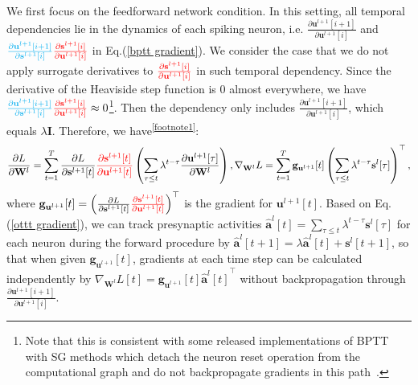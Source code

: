 \documentclass{article}
\begin{document}
We first focus on the feedforward network condition. In this setting, all temporal dependencies lie in the dynamics of each spiking neuron, i.e. {\color[rgb]{0,0.69,0.31}$\frac{\partial \mathbf{u}^{l+1}[i+1]}{\partial \mathbf{u}^{l+1}[i]}$} and ${\color{cyan}\frac{\partial \mathbf{u}^{l+1}[i+1]}{\partial \mathbf{s}^{l+1}[i]}}{\color{red}\frac{\partial \mathbf{s}^{l+1}[i]}{\partial \mathbf{u}^{l+1}[i]}}$ in Eq.(\ref{bptt gradient}). We consider the case that we do not apply surrogate derivatives to ${\color{red}\frac{\partial \mathbf{s}^{l+1}[i]}{\partial \mathbf{u}^{l+1}[i]}}$ in such temporal dependency. Since the derivative of the Heaviside step function is 0 almost everywhere, we have ${\color{cyan}\frac{\partial \mathbf{u}^{l+1}[i+1]}{\partial \mathbf{s}^{l+1}[i]}}{\color{red}\frac{\partial \mathbf{s}^{l+1}[i]}{\partial \mathbf{u}^{l+1}[i]}} \approx 0$\footnote{Note that this is consistent with some released implementations of BPTT with SG methods which detach the neuron reset operation from the computational graph and do not backpropagate gradients in this path~\cite{Fang_2021_ICCV,fang2021deep}.}. Then the dependency only includes {\color[rgb]{0,0.69,0.31}$\frac{\partial \mathbf{u}^{l+1}[i+1]}{\partial \mathbf{u}^{l+1}[i]}$}, which equals $\lambda \mathbf{I}$. 
Therefore, we have\textsuperscript{\ref{footnote1}}:
\begin{equation}
    \frac{\partial L}{\partial \mathbf{W}^l}=\sum_{t=1}^{T} \frac{\partial L}{\partial \mathbf{s}^{l+1}[t]}{\color{red}\frac{\partial \mathbf{s}^{l+1}[t]}{\partial \mathbf{u}^{l+1}[t]}}\left(\sum_{\tau \leq t}\lambda^{t-\tau}\frac{\partial \mathbf{u}^{l+1}[\tau]}{\partial \mathbf{W}^l}\right), \nabla_{\mathbf{W}^l}L = \sum_{t=1}^T \mathbf{g}_{\mathbf{u}^{l+1}}[t]\left(\sum_{\tau \leq t}\lambda^{t-\tau}\mathbf{s}^l[\tau]\right)^\top,
    \label{ottt gradient}
\end{equation}
where $\mathbf{g}_{\mathbf{u}^{l+1}}[t]=\left(\frac{\partial L}{\partial \mathbf{s}^{l+1}[t]}{\color{red}\frac{\partial \mathbf{s}^{l+1}[t]}{\partial \mathbf{u}^{l+1}[t]}}\right)^\top$ is the gradient for $\mathbf{u}^{l+1}[t]$. Based on Eq.(\ref{ottt gradient}), we can track presynaptic activities $\hat{\mathbf{a}}^l[t] = \sum_{\tau \leq t}\lambda^{t-\tau}\mathbf{s}^l[\tau]$ for each neuron during the forward procedure by $\hat{\mathbf{a}}^l[t+1]=\lambda \hat{\mathbf{a}}^l[t]+\mathbf{s}^l[t+1]$, so that when given $\mathbf{g}_{\mathbf{u}^{l+1}}[t]$, gradients at each time step can be calculated independently by $\nabla_{\mathbf{W}^l}L[t]=\mathbf{g}_{\mathbf{u}^{l+1}}[t]{\hat{\mathbf{a}}^l[t]}^\top$ without backpropagation through {\color[rgb]{0,0.69,0.31}$\frac{\partial \mathbf{u}^{l+1}[i+1]}{\partial \mathbf{u}^{l+1}[i]}$}. 
\end{document}
